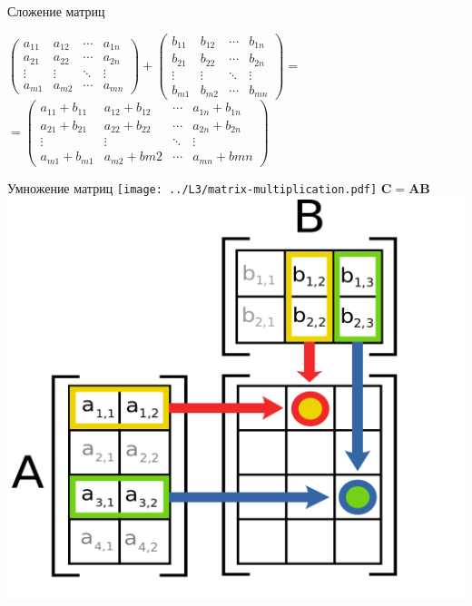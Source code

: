 \documentclass[10pt]{beamer}
\begin{document}
	\begin{frame}{Сложение матриц}
		
		$
		\begin{pmatrix} a_{11} & a_{12} & \cdots & a_{1n}
			\\a_{21} & a_{22} & \cdots & a_{2n}
			\\ \vdots & \vdots & \ddots & \vdots
			\\ a_{m1} & a_{m2} & \cdots & a_{mn}
		\end{pmatrix} 
		+
		\begin{pmatrix} b_{11} & b_{12} & \cdots & b_{1n}
			\\b_{21} & b_{22} & \cdots & b_{2n}
			\\ \vdots & \vdots & \ddots & \vdots
			\\ b_{m1} & b_{m2} & \cdots & b_{mn}
		\end{pmatrix} 
		=$
		$
		=
		\begin{pmatrix} a_{11}+b_{11} & a_{12}+b_{12} & \cdots & a_{1n}+b_{1n}
			\\a_{21}+b_{21} & a_{22}+b_{22} & \cdots & a_{2n}+b_{2n}
			\\ \vdots & \vdots & \ddots & \vdots
			\\ a_{m1}+b_{m1} & a_{m2}+b{m2} & \cdots & a_{mn}+b{mn}
		\end{pmatrix} 
		$
		
	\end{frame}
	
	\begin{frame}{Умножение матриц}
		{
			\texttt{[image: ../L3/matrix-multiplication.pdf]}
		}
		{
			$\mathbf C = \mathbf A \mathbf B$\\
			\includegraphics[width=\textwidth]{../L3/Matrix_multiplication_diagram_2.svg.png}
		}
		
	\end{frame}
	
\end{document}
